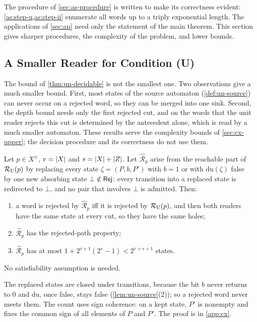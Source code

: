 \begin{remark}[Complexity]\label{rem:as-complexity}
The procedure of \cref{sec:as-procedure} is written to make its correctness
evident: \cref{as:step-u,as:step-ii} enumerate all words up to a triply
exponential length. The applications of \cref{sec:ap} need only the statement
of the main theorem. This section gives sharper procedures, the complexity of
the problem, and lower bounds.
\end{remark}

\subsection{A Smaller Reader for Condition (U)}\label{sec:un-smaller}

The bound of \cref{thm:un-decidable} is not the smallest one. Two observations
give a much smaller bound. First, most states of the source automaton
(\cref{def:un-source}) can never occur on a rejected word, so they can be
merged into one sink. Second, the depth bound needs only the first rejected
cut, and on the words that the unit reader rejects this cut is determined by
the antecedent alone, which is read by a much smaller automaton. These results
serve the complexity bounds of \cref{sec:cx-upper}; the decision procedure and
its correctness do not use them.

\begin{lemma}\label{lem:un-reduced}
Let $p\in X^\pm$, $v=\lvert X\rvert$ and $s=\lvert X\rvert+\lvert Z\rvert$. Let $\widehat{\mathcal R}_p$
arise from the reachable part of $\mathcal R_{\mathrm U}(p)$ by replacing every state
$\zeta=(P,b,P')$ with $b=1$ or with $\mathrm{du}(\zeta)$ false by one new
absorbing state $\bot\notin\mathsf{Rej}$: every transition into a replaced state is
redirected to $\bot$, and no pair that involves $\bot$ is admitted. Then:
\begin{enumerate}[leftmargin=*]
\item a word is rejected by $\widehat{\mathcal R}_p$ iff it is rejected by
  $\mathcal R_{\mathrm U}(p)$, and then both readers have the same state at every cut, so they
  have the same holes;
\item $\widehat{\mathcal R}_p$ has the rejected-path property;
\item $\widehat{\mathcal R}_p$ has at most $1+2^{v+1}(2^s-1)<2^{v+s+1}$ states.
\end{enumerate}
No satisfiability assumption is needed.
\end{lemma}

The replaced states are closed under transitions, because the bit $b$ never
returns to $0$ and $\mathrm{du}$, once false, stays false
(\cref{lem:un-source}(2)); so a rejected word never meets them. The count uses
sign coherence: on a kept state, $P'$ is nonempty and fixes the common sign of
all elements of $P$ and $P'$. The proof is in \cref{app:cx}.

